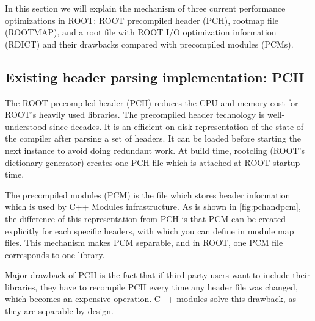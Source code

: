 \documentclass{webofc}
\begin{document}
In this section we will explain the mechanism of three current performance optimizations in ROOT: ROOT precompiled header (PCH), rootmap file (ROOTMAP), and a root file with ROOT I/O optimization information (RDICT) and their drawbacks compared with precompiled modules (PCMs).

\subsection{Existing header parsing implementation: PCH}
\label{pch}

The ROOT precompiled header (PCH) reduces the CPU and memory cost for ROOT’s heavily used libraries. The precompiled header technology is well-understood since decades. It is an efficient on-disk representation of the state of the compiler after parsing a set of headers. It can be loaded before starting the next instance to avoid doing redundant work. At build time, rootcling (ROOT’s dictionary generator) creates one PCH file which is attached at ROOT startup time.

The precompiled modules (PCM) is the file which stores header information which is used by C++ Modules infrastructure. As is shown in \ref{fig:pchandpcm}, the difference of this representation from PCH is that PCM can be created explicitly for each specific headers, with which you can define in module map files. This mechanism makes PCM separable, and in ROOT, one PCM file corresponds to one library.

Major drawback of PCH is the fact that if third-party users want to include their libraries, they have to recompile PCH every time any header file was changed, which becomes an expensive operation. C++ modules solve this drawback, as they are separable by design.
\end{document}
